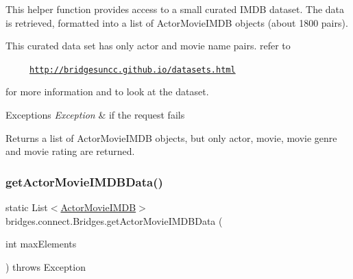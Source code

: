 This helper function provides access to a small curated I\+M\+DB dataset. The data is retrieved, formatted into a list of Actor\+Movie\+I\+M\+DB objects (about 1800 pairs).

This curated data set has only actor and movie name pairs. refer to 

~~~~~\href{http://bridgesuncc.github.io/datasets.html}{\tt http\+://bridgesuncc.\+github.\+io/datasets.\+html} 

for more information and to look at the dataset.


\begin{DoxyExceptions}{Exceptions}
{\em Exception} & if the request fails\\
\hline
\end{DoxyExceptions}
\begin{DoxyReturn}{Returns}
a list of Actor\+Movie\+I\+M\+DB objects, but only actor, movie, movie genre and movie rating are returned. 
\end{DoxyReturn}
\mbox{\label{classbridges_1_1connect_1_1_bridges_a76280ef69f0205e3711b18617e5c7646}} 
\subsubsection{\texorpdfstring{get\+Actor\+Movie\+I\+M\+D\+B\+Data()}{getActorMovieIMDBData()}\hspace{0.1cm}{\footnotesize\ttfamily [2/2]}}
{\footnotesize\ttfamily static List$<$\mbox{\hyperlink{classbridges_1_1data__src__dependent_1_1_actor_movie_i_m_d_b}{Actor\+Movie\+I\+M\+DB}}$>$ bridges.\+connect.\+Bridges.\+get\+Actor\+Movie\+I\+M\+D\+B\+Data (\begin{DoxyParamCaption}\item[{int}]{max\+Elements }\end{DoxyParamCaption}) throws Exception\hspace{0.3cm}{\ttfamily [static]}}

\mbox{\label{classbridges_1_1connect_1_1_bridges_a7a5f5efc6712ead5babe4cd21a4de3cc}} 
